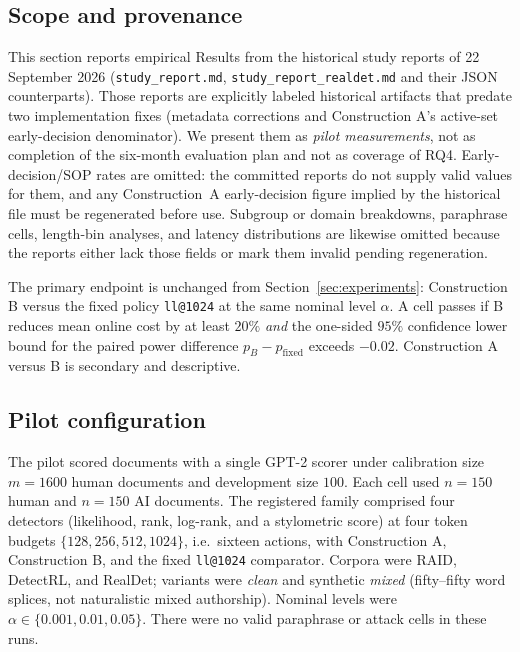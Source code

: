 \documentclass[pdflatex,sn-mathphys-num]{sn-jnl}
\begin{document}
\subsection{Scope and provenance}

This section reports empirical Results from the historical study reports of 22 September 2026 (\texttt{study\_report.md}, \texttt{study\_report\_realdet.md} and their JSON counterparts). Those reports are explicitly labeled historical artifacts that predate two implementation fixes (metadata corrections and Construction A's active-set early-decision denominator). We present them as \emph{pilot measurements}, not as completion of the six-month evaluation plan and not as coverage of RQ4. Early-decision/SOP rates are omitted: the committed reports do not supply valid values for them, and any Construction~A early-decision figure implied by the historical file must be regenerated before use. Subgroup or domain breakdowns, paraphrase cells, length-bin analyses, and latency distributions are likewise omitted because the reports either lack those fields or mark them invalid pending regeneration.

The primary endpoint is unchanged from Section~\ref{sec:experiments}: Construction B versus the fixed policy \texttt{ll@1024} at the same nominal level \(\alpha\). A cell passes if B reduces mean online cost by at least \(20\%\) \emph{and} the one-sided \(95\%\) confidence lower bound for the paired power difference \(p_B-p_{\mathrm{fixed}}\) exceeds \(-0.02\). Construction A versus B is secondary and descriptive.

\subsection{Pilot configuration}

The pilot scored documents with a single GPT-2 scorer under calibration size \(m=1600\) human documents and development size \(100\). Each cell used \(n=150\) human and \(n=150\) AI documents. The registered family comprised four detectors (likelihood, rank, log-rank, and a stylometric score) at four token budgets \(\{128,256,512,1024\}\), i.e.\ sixteen actions, with Construction A, Construction B, and the fixed \texttt{ll@1024} comparator. Corpora were RAID, DetectRL, and RealDet; variants were \emph{clean} and synthetic \emph{mixed} (fifty--fifty word splices, not naturalistic mixed authorship). Nominal levels were \(\alpha\in\{0.001,0.01,0.05\}\). There were no valid paraphrase or attack cells in these runs.
\end{document}
